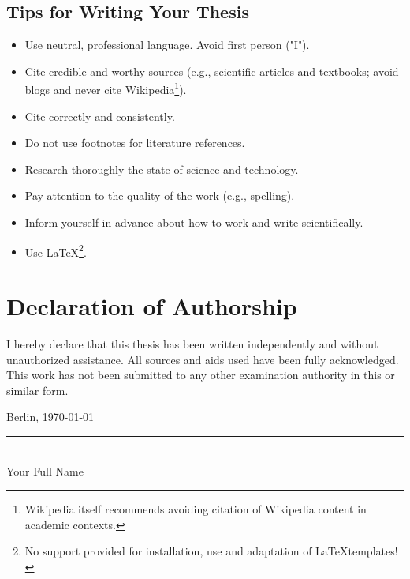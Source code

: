 \documentclass[oneside,bibliography=totocnumbered,BCOR=5mm]{scrbook}
\begin{document}
\section{Tips for Writing Your Thesis}

\begin{itemize}
\item Use neutral, professional language. Avoid first person ("I").
\item Cite credible and worthy sources (e.g., scientific articles and textbooks; avoid blogs and never cite Wikipedia\footnote{Wikipedia itself recommends avoiding citation of Wikipedia content in academic contexts.}).
\item Cite correctly and consistently.
\item Do not use footnotes for literature references.
\item Research thoroughly the state of science and technology.
\item Pay attention to the quality of the work (e.g., spelling).
\item Inform yourself in advance about how to work and write scientifically.
\item Use \LaTeX\footnote{No support provided for installation, use and adaptation of \LaTeX templates!}.
\end{itemize}

\backmatter

\chapter*{Declaration of Authorship}

I hereby declare that this thesis has been written independently and without unauthorized assistance. All sources and aids used have been fully acknowledged. This work has not been submitted to any other examination authority in this or similar form.

\vspace{2cm}
\noindent Berlin, \today

\vspace{1.5cm}
\noindent\rule{6cm}{0.4pt}\\
Your Full Name
\end{document}

